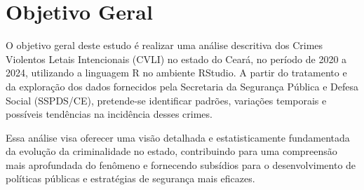 \documentclass{exam}
\begin{document}
\section{Objetivo Geral}
O objetivo geral deste estudo é realizar uma análise descritiva dos Crimes Violentos Letais Intencionais (CVLI) no estado do Ceará, no período de 2020 a 2024, utilizando a linguagem R no ambiente RStudio. A partir do tratamento e da exploração dos dados fornecidos pela Secretaria da Segurança Pública e Defesa Social (SSPDS/CE), pretende-se identificar padrões, variações temporais e possíveis tendências na incidência desses crimes.

Essa análise visa oferecer uma visão detalhada e estatisticamente fundamentada da evolução da criminalidade no estado, contribuindo para uma compreensão mais aprofundada do fenômeno e fornecendo subsídios para o desenvolvimento de políticas públicas e estratégias de segurança mais eficazes.

\end{document}
